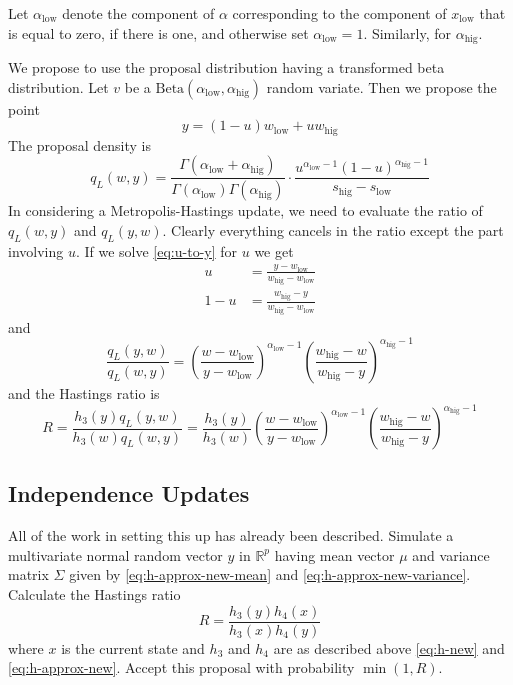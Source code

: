 \documentclass[11pt]{article}
\newcommand{\real}{\mathbb{R}}
\begin{document}
Let $\alpha_\text{low}$ denote the
component of $\alpha$ corresponding to the component of $x_\text{low}$ that
is equal to zero, if there is one, and otherwise set $\alpha_\text{low} = 1$.
Similarly, for $\alpha_\text{hig}$.

We propose to use the proposal distribution having a transformed
beta distribution.  Let $v$ be a
$\text{Beta}(\alpha_\text{low}, \alpha_\text{hig})$ random variate.
Then we propose the point
\begin{equation} \label{eq:u-to-y}
   y = (1 - u) w_\text{low} + u w_\text{hig}
\end{equation}
The proposal density is
$$
   q_L(w, y)
   =
   \frac{\Gamma(\alpha_\text{low} + \alpha_\text{hig})}
   {\Gamma(\alpha_\text{low}) \Gamma(\alpha_\text{hig})}
   \cdot
   \frac{u^{\alpha_\text{low} - 1} (1 - u)^{\alpha_\text{hig} - 1}}
   {s_\text{hig} - s_\text{low}}
$$
In considering a Metropolis-Hastings update, we need to evaluate
the ratio of $q_L(w, y)$ and $q_L(y, w)$.  Clearly everything cancels
in the ratio except the part involving $u$.  If we solve \eqref{eq:u-to-y}
for $u$ we get
\begin{align*}
   u & = \frac{y - w_\text{low}}{w_\text{hig} - w_\text{low}}
   \\
   1 - u & = \frac{w_\text{hig} - y}{w_\text{hig} - w_\text{low}}
\end{align*}
and
$$
   \frac{q_L(y, w)}{q_L(w, y)}
   =
   \left( \frac{w - w_\text{low}}{y - w_\text{low}}
   \right)^{\alpha_\text{low} - 1}
   \left( \frac{w_\text{hig} - w}{w_\text{hig} - y}
   \right)^{\alpha_\text{hig} - 1}
$$
and the Hastings ratio is
\begin{equation} \label{eq:ratio-beta-hastings}
   R = \frac{h_3(y) q_L(y, w)}{h_3(w) q_L(w, y)}
   =
   \frac{h_3(y)}{h_3(w)}
   \left( \frac{w - w_\text{low}}{y - w_\text{low}}
   \right)^{\alpha_\text{low} - 1}
   \left( \frac{w_\text{hig} - w}{w_\text{hig} - y}
   \right)^{\alpha_\text{hig} - 1}
\end{equation}

\subsection{Independence Updates} \label{sec:independence}

All of the work in setting this up has already been described.  Simulate
a multivariate normal random vector $y$ in $\real^p$ having mean vector $\mu$
and variance matrix $\Sigma$ given by \eqref{eq:h-approx-new-mean}
and \eqref{eq:h-approx-new-variance}.  Calculate the Hastings ratio
\begin{equation} \label{eq:ratio-independence}
    R = \frac{h_3(y) h_4(x)}{h_3(x) h_4(y)}
\end{equation}
where $x$ is the current state and $h_3$ and $h_4$ are as described above
\eqref{eq:h-new} and \eqref{eq:h-approx-new}.  Accept this proposal
with probability $\min(1, R)$.
\end{document}
